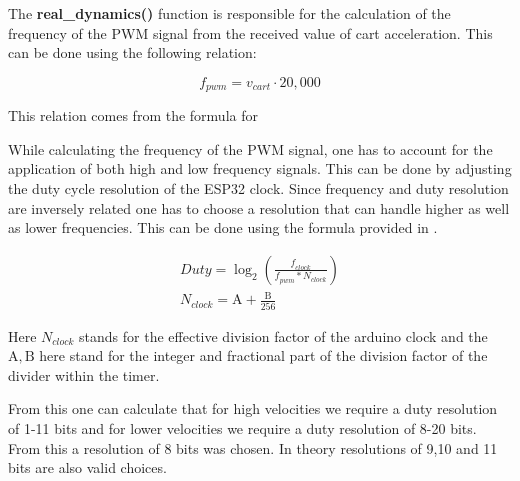 The \textbf{real\_dynamics()} function is responsible for the calculation of the frequency of the PWM signal from the received value of cart acceleration. This can be done using the following relation:

\begin{equation}
	f_{pwm} = v_{cart}\cdot20,000
\end{equation}

This relation comes from the formula for 

While calculating the frequency of the PWM signal, one has to account for the application of both high and low frequency signals. This can be done by adjusting the duty cycle resolution of the ESP32 clock.  Since frequency and duty resolution are inversely related one has to choose a resolution that can handle higher as well as lower frequencies. This can be done using the formula provided in \cite{ESPManual}. 

\begin{eqnarray}
	Duty  =\log_2 \left ( \frac{\mathit{f}_{clock}} {\mathit{f}_{pwm} * N_{clock}} \right)
	\\
	N_{clock} = \mathrm{A} + \frac{\mathrm{B}}{256}
\end{eqnarray}


Here $N_{clock}$ stands for the effective division factor of the arduino clock and the $\mathrm{A,B}$ here stand for the integer and fractional part of the division factor of the divider within the timer.  

From this one can calculate that for high velocities we require a duty resolution of 1-11 bits and for lower velocities we require a duty resolution of 8-20 bits. From this a resolution of 8 bits was chosen. In theory resolutions of 9,10 and 11 bits are also valid choices. 




